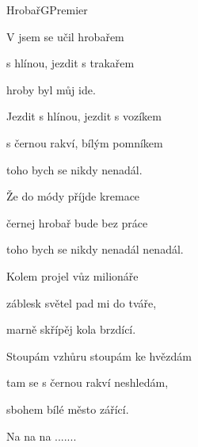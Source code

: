 \begin{song}{Hrobař}{G}{Premier}

\begin{SBVerse}

V  jsem se učil hrobařem

 s hlínou, jezdit s trakařem

 hroby byl můj ide.

\end{SBVerse}

\begin{SBVerse}

Jezdit s hlínou, jezdit s vozíkem

s černou rakví, bílým pomníkem

toho bych se nikdy nenadál.

\end{SBVerse}

\begin{SBVerse}

Že do módy příjde kremace

černej hrobař bude bez práce

toho bych se nikdy nenadál nenadál.

\end{SBVerse}

\begin{SBVerse}

Kolem projel vůz milionáře

záblesk světel pad mi do tváře,

marně skřípěj kola brzdící.

\end{SBVerse}

\begin{SBVerse}

Stoupám vzhůru stoupám ke hvězdám

tam se s černou rakví neshledám,

sbohem bílé město zářící.

\end{SBVerse}

\begin{SBVerse}

Na na na .......

\end{SBVerse}

\end{song}

\pagebreak